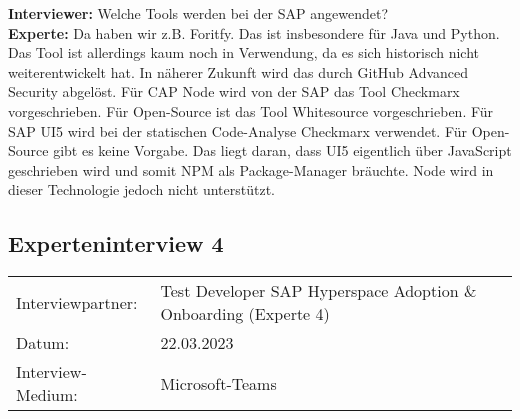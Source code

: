 \begin{linenumbers}
    \textbf{Interviewer:} Welche Tools werden bei der SAP angewendet?\\
    \textbf{Experte:} Da haben wir z.B. Foritfy. Das ist insbesondere für Java und Python. Das Tool ist allerdings kaum noch in Verwendung, da es sich historisch nicht weiterentwickelt hat. In näherer Zukunft wird das durch GitHub Advanced Security abgelöst. Für CAP Node wird von der SAP das Tool Checkmarx vorgeschrieben. Für Open-Source ist das Tool Whitesource vorgeschrieben. Für SAP UI5 wird bei der statischen Code-Analyse Checkmarx verwendet. Für Open-Source gibt es keine Vorgabe. Das liegt daran, dass UI5 eigentlich über JavaScript geschrieben wird und somit NPM als Package-Manager bräuchte. Node wird in dieser Technologie jedoch nicht unterstützt.
\end{linenumbers}

\newpage
\resetlinenumber
\subsection{Experteninterview 4}
	\begin{tabular}{ l l }
		Interviewpartner: & Test Developer SAP Hyperspace Adoption \& Onboarding (Experte 4)\\
		Datum: & 22.03.2023\\
		Interview-Medium: & Microsoft-Teams\\
\end{tabular}\\\\

